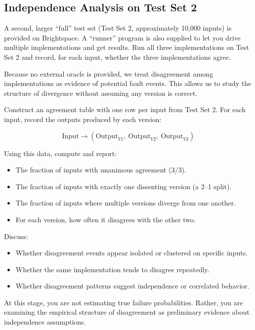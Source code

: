 \subsection{Independence Analysis on Test Set 2}

A second, larger ``full'' test set (Test Set 2, approximately 10{,}000 inputs) is provided on Brightspace.
A ``runner'' program is also supplied to let you drive multiple implementations and get results.
Run all three implementations on Test Set 2 and record, for each input, whether the three implementations agree.

Because no external oracle is provided, we treat disagreement among implementations as evidence of potential fault events.
This allows us to study the structure of divergence without assuming any version is correct.

Construct an agreement table with one row per input from Test Set 2.
For each input, record the outputs produced by each version:

\[
\text{Input} \rightarrow (\text{Output}_{V1},\ \text{Output}_{V2},\ \text{Output}_{V3})
\]


Using this data, compute and report:

\begin{itemize}
  \item The fraction of inputs with unanimous agreement (3/3).
  \item The fraction of inputs with exactly one dissenting version (a 2--1 split).
  \item The fraction of inputs where multiple versions diverge from one another.
  \item For each version, how often it disagrees with the other two.
\end{itemize}

Discuss:

\begin{itemize}
  \item Whether disagreement events appear isolated or clustered on specific inputs.
  \item Whether the same implementation tends to disagree repeatedly.
  \item Whether disagreement patterns suggest independence or correlated behavior.
\end{itemize}

At this stage, you are not estimating true failure probabilities.
Rather, you are examining the empirical structure of disagreement as preliminary evidence about independence assumptions.

